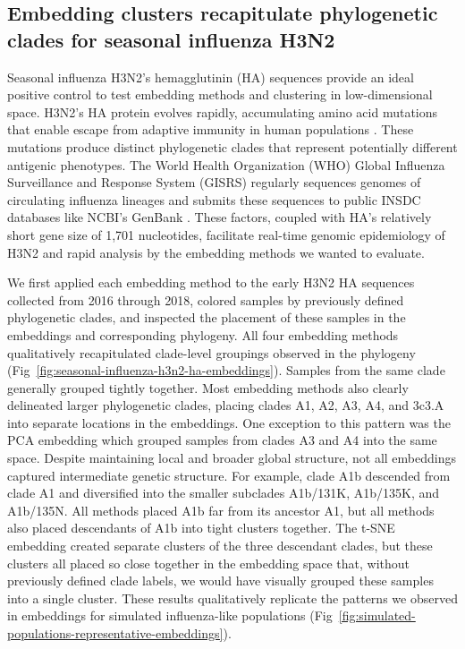 \documentclass[10pt,letterpaper]{article}
\begin{document}
\subsection*{Embedding clusters recapitulate phylogenetic clades for seasonal influenza H3N2}

Seasonal influenza H3N2's hemagglutinin (HA) sequences provide an ideal positive control to test embedding methods and clustering in low-dimensional space.
H3N2's HA protein evolves rapidly, accumulating amino acid mutations that enable escape from adaptive immunity in human populations \cite{Petrova2018}.
These mutations produce distinct phylogenetic clades that represent potentially different antigenic phenotypes.
The World Health Organization (WHO) Global Influenza Surveillance and Response System (GISRS) regularly sequences genomes of circulating influenza lineages \cite{Hay2018} and submits these sequences to public INSDC databases like NCBI's GenBank \cite{Arita2021}.
These factors, coupled with HA's relatively short gene size of 1,701 nucleotides, facilitate real-time genomic epidemiology of H3N2 \cite{Neher2015} and rapid analysis by the embedding methods we wanted to evaluate.

We first applied each embedding method to the early H3N2 HA sequences collected from 2016 through 2018, colored samples by previously defined phylogenetic clades, and inspected the placement of these samples in the embeddings and corresponding phylogeny.
All four embedding methods qualitatively recapitulated clade-level groupings observed in the phylogeny (Fig~\ref{fig:seasonal-influenza-h3n2-ha-embeddings}).
Samples from the same clade generally grouped tightly together.
Most embedding methods also clearly delineated larger phylogenetic clades, placing clades A1, A2, A3, A4, and 3c3.A into separate locations in the embeddings.
One exception to this pattern was the PCA embedding which grouped samples from clades A3 and A4 into the same space.
Despite maintaining local and broader global structure, not all embeddings captured intermediate genetic structure.
For example, clade A1b descended from clade A1 and diversified into the smaller subclades A1b/131K, A1b/135K, and A1b/135N.
All methods placed A1b far from its ancestor A1, but all methods also placed descendants of A1b into tight clusters together.
The t-SNE embedding created separate clusters of the three descendant clades, but these clusters all placed so close together in the embedding space that, without previously defined clade labels, we would have visually grouped these samples into a single cluster.
These results qualitatively replicate the patterns we observed in embeddings for simulated influenza-like populations (Fig~\ref{fig:simulated-populations-representative-embeddings}).
\end{document}
